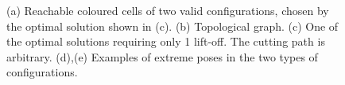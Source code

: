\documentclass[journal]{IEEEtran}
\begin{document}
\begin{figure}[t]
\centering
{}
\caption{(a) Reachable coloured cells of two valid configurations, chosen by the optimal solution shown in (c). 
(b) Topological graph. (c) One of the optimal solutions requiring only 1 lift-off. 
The cutting path is arbitrary. (d),(e) Examples of extreme poses in the two types of configurations.}
\label{fig_realworld_no}
\end{figure}
\end{document}
